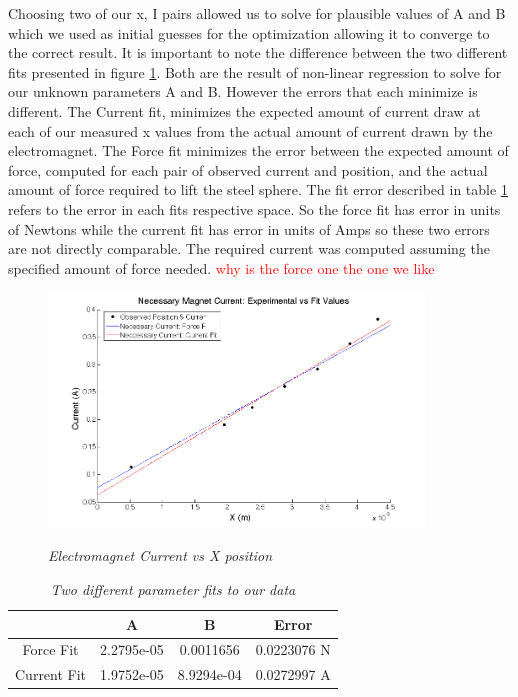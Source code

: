 \documentclass{article}
\newcommand{\xxx}[1]{\textcolor{red}{#1}}
\theoremstyle{plain}
\theoremstyle{definition}
\theoremstyle{remark}
\begin{document}
Choosing two of our x, I pairs allowed us to solve for plausible values of A and B which we used as initial guesses for the optimization allowing it to converge to the correct result.  It is important to note the difference between the two different fits presented in figure \ref{Q1_d3}.  Both are the result of non-linear regression to solve for our unknown parameters A and B.  However the errors that each minimize is different.  The Current fit, minimizes the expected amount of current draw at each of our measured x values from the actual amount of current drawn by the electromagnet.  The Force fit minimizes the error between the expected amount of force, computed for each pair of observed current and position, and the actual amount of force required to lift the steel sphere.  The fit error described in table \ref{Q1_dt2} refers to the error in each fits respective space.  So the force fit has error in units of Newtons while the current fit has error in units of Amps so these two errors are not directly comparable.  The required current was computed assuming the specified amount of force needed.
\xxx{why is the force one the one we like}

\begin{figure}
\begin{center}
\includegraphics[width = 10cm]{magnetDataFits.png}
\label{Q1_d3}
\caption{\emph{Electromagnet Current vs X position}}
\end{center}
\end{figure}

\begin{table}
\begin{center}
    \begin{tabular}{|c|c|c|c|}
        \hline
        ~           & A          & B         &  Error \\ \hline
        Force Fit   & 2.2795e-05 & 0.0011656  & 0.0223076 N \\ 
        Current Fit & 1.9752e-05 & 8.9294e-04 & 0.0272997 A\\
        \hline
    \end{tabular}
\caption{\emph{Two different parameter fits to our data}}
\label{Q1_dt2}
\end{center}
\end{table}
\end{document}

